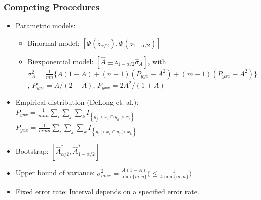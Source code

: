 \documentclass{beamer}
\begin{document}
\begin{frame}
\frametitle{Competing Procedures}

\begin{itemize}

    \item Parametric models:
    \begin{itemize}
        \item Binormal model: $[\Phi(\tilde{z}_{\alpha/2}), \Phi(\tilde{z}_{1-\alpha/2})]$
        \item Biexponential model: $[\hat{A} \pm  z_{1-\alpha/2} \hat{\sigma}_A]$, with \\
        $\sigma^2_A = \frac{1}{mn} \{ A(1 - A) + (n - 1)(P_{yyx} - A^2) + (m - 1)(P_{yxx} - A^2) \}$,
        $P_{yyx} = A/(2-A)$, $P_{yxx} = 2A^2/(1+A)$
    \end{itemize}

    \item Empirical distribution (DeLong et. al.): \\
    $P_{yyx} = \frac{1}{mnn} \sum_i \sum_j \sum_k I_{\left\{ y_j > x_i \cap y_k > x_i \right\}}$ \\
    $P_{yxx} = \frac{1}{mmn} \sum_i \sum_j \sum_k I_{\left\{ y_j > x_i \cap y_j > x_k \right\}}$
    
    \item Bootstrap: $[\hat{A}_{\alpha/2}^*, \hat{A}_{1-\alpha/2}^*]$

    \item Upper bound of variance: $\sigma^2_{max} = \frac{A(1-A)}{\min\{ m, n \}} \big( \leq \frac{1}{4 \min\{ m, n \} } \big) $

    \item Fixed error rate: Interval depends on a specified error rate. 

\end{itemize}

\end{frame}

\end{document}
